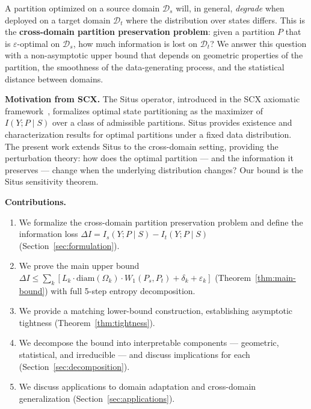\documentclass[12pt,a4paper]{article}
\newcommand{\cD}{\mathcal{D}}
\newcommand{\Wass}{W_1}
\newcommand{\diam}{\mathrm{diam}}
\begin{document}
A partition optimized on a source domain $\cD_s$ will, in general,
\emph{degrade} when deployed on a target domain $\cD_t$ where the
distribution over states differs.  This is the \textbf{cross-domain
partition preservation problem}: given a partition $P$ that is
$\varepsilon$-optimal on $\cD_s$, how much information is lost on
$\cD_t$?  We answer this question with a non-asymptotic upper bound that
depends on geometric properties of the partition, the smoothness of the
data-generating process, and the statistical distance between domains.

\medskip\noindent
\textbf{Motivation from SCX.}
The Situs operator, introduced in the SCX axiomatic
framework~\citep{scx2024situs}, formalizes optimal state partitioning as
the maximizer of $I(Y;P\mid S)$ over a class of admissible partitions.
Situs provides existence and characterization results for optimal
partitions under a fixed data distribution.  The present work extends
Situs to the cross-domain setting, providing the perturbation theory:
how does the optimal partition — and the information it preserves —
change when the underlying distribution changes?  Our bound is the
Situs sensitivity theorem.

\medskip\noindent
\textbf{Contributions.}
\begin{enumerate}[label=(\arabic*)]
    \item We formalize the cross-domain partition preservation problem and
          define the information loss $\Delta I = I_s(Y;P\mid S) -
          I_t(Y;P\mid S)$ (Section~\ref{sec:formulation}).
    \item We prove the main upper bound
          $\Delta I \leq \sum_{k}[L_k\cdot\diam(\Omega_k)\cdot\Wass(P_s,P_t)
          + \delta_k + \varepsilon_k]$
          (Theorem~\ref{thm:main-bound}) with full 5-step entropy decomposition.
    \item We provide a matching lower-bound construction, establishing
          asymptotic tightness (Theorem~\ref{thm:tightness}).
    \item We decompose the bound into interpretable components — geometric,
          statistical, and irreducible — and discuss implications for
          each (Section~\ref{sec:decomposition}).
    \item We discuss applications to domain adaptation and cross-domain
          generalization (Section~\ref{sec:applications}).
\end{enumerate}

\end{document}

